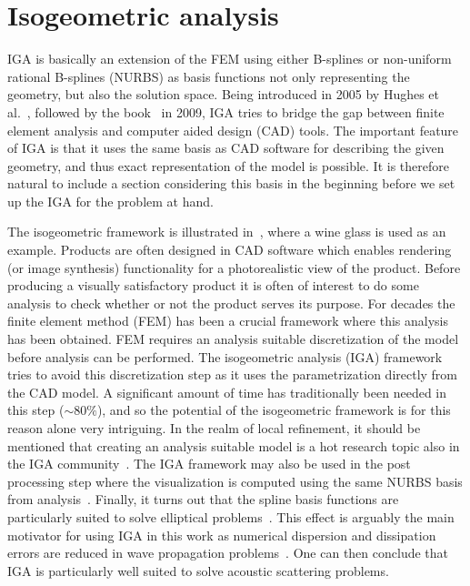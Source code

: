\section{Isogeometric analysis}
\label{sec:iga}
IGA is basically an extension of the FEM using either B-splines or non-uniform rational B-splines (NURBS) as basis functions not only representing the geometry, but also the solution space. Being introduced in 2005 by Hughes et al.~\cite{Hughes2005iac}, followed by the book~\cite{Cottrell2009iat} in 2009, IGA tries to bridge the gap between finite element analysis and computer aided design (CAD) tools. The important feature of IGA is that it uses the same basis as CAD software for describing the given geometry, and thus exact representation of the model is possible. It is therefore natural to include a section considering this basis in the beginning before we set up the IGA for the problem at hand.

The isogeometric framework is illustrated in~, where a wine glass is used as an example. Products are often designed in CAD software which enables rendering (or image synthesis) functionality for a photorealistic view of the product. Before producing a visually satisfactory product it is often of interest to do some analysis to check whether or not the product serves its purpose. For decades the finite element method (FEM) has been a crucial framework where this analysis has been obtained. FEM requires an analysis suitable discretization of the model before analysis can be performed. The isogeometric analysis (IGA) framework tries to avoid this discretization step as it uses the parametrization directly from the CAD model. A significant amount of time has traditionally been needed in this step ($\sim 80\%$), and so the potential of the isogeometric framework is for this reason alone very intriguing. In the realm of local refinement, it should be mentioned that creating an analysis suitable model is a hot research topic also in the IGA community~\cite{Bazilevs2010iau,Scott2011tsa,Scott2012lro,Scott2013ibe,Evans2015hts,Sangalli2016uss,Toshniwal2017scs}. The IGA framework may also be used in the post processing step where the visualization is computed using the same NURBS basis from analysis~\cite{Stahl2017ppa}. Finally, it turns out that the spline basis functions are particularly suited to solve elliptical problems~\cite{BeiraodaVeiga2011sef,BeiraodaVeiga2014mao}. This effect is arguably the main motivator for using IGA in this work as numerical dispersion and dissipation errors are reduced in wave propagation problems~\cite{Cottrell2007sor,Dede2015ind,Wen2018aqb,Pegolotti2019iao}. One can then conclude that IGA is particularly well suited to solve acoustic scattering problems.

